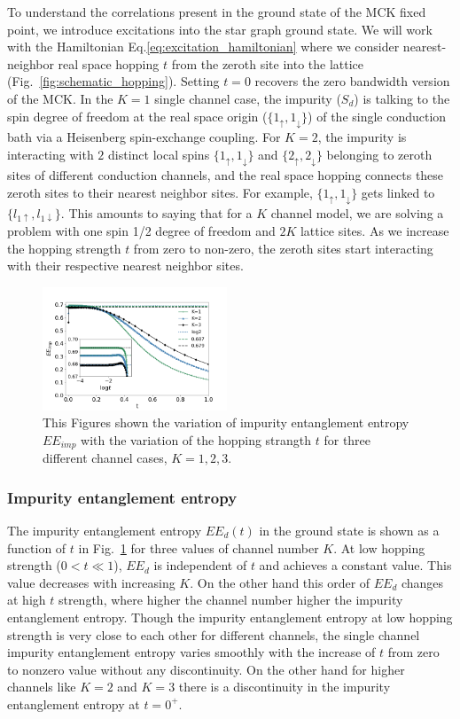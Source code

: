 \documentclass[reprint,prb,superscriptaddress]{revtex4-2}
\begin{document}
To understand the correlations present in the ground state of the MCK fixed point, we introduce excitations into the star graph ground state. We will work with the Hamiltonian Eq.\eqref{eq:excitation_hamiltonian} where we consider nearest-neighbor real space hopping \(t\) from the zeroth site into the lattice (Fig.~\ref{fig:schematic_hopping}). Setting $t=0$ recovers the zero bandwidth version of the MCK. In the \(K=1\) single channel case, the impurity ($S_d$) is talking to the spin degree of freedom at the real space origin ($\{1_{\uparrow},1_{\downarrow}\}$) of the single conduction bath via a Heisenberg spin-exchange coupling. For $K=2$, the impurity is interacting with $2$ distinct local spins $\{1_{\uparrow},1_{\downarrow}\}$ and $\{2_{\uparrow},2_{\downarrow}\}$ belonging to zeroth sites of different conduction channels, and the real space hopping connects these zeroth sites to their nearest neighbor sites. For example, $\{1_{\uparrow},1_{\downarrow}\}$ gets linked to $\{l_{1\uparrow},l_{1\downarrow}\}$. This amounts to saying that for a $K$ channel model, we are solving a problem with one spin 1/2 degree of freedom and $2K$ lattice sites. As we increase the hopping strength $t$ from zero to non-zero, the zeroth sites start interacting with their respective nearest neighbor sites.
\begin{figure}[!htpb]
\centering
\includegraphics[width=0.49\textwidth]{plt/A_I1_ch123_['d']}
\caption{This Figures shown the variation of impurity entanglement entropy $EE_{imp}$ with the variation of the hopping strangth $t$ for three different channel cases, $K=1,2,3$. }
\label{fig:EE_imp_vs_t_K}
\end{figure}

\subsubsection{Impurity entanglement entropy}
The impurity entanglement entropy $EE_d(t)$ in the ground state is shown as a function of $t$ in Fig.~\ref{fig:EE_imp_vs_t_K} for three values of channel number \(K\). At low hopping strength ($0<t\ll 1$), $EE_{d}$ is independent of $t$ and achieves a constant value. This value decreases with increasing \(K\). On the other hand this order of $EE_{d}$ changes at high $t$ strength, where higher the channel number higher the impurity entanglement entropy. Though the impurity entanglement entropy at low hopping strength is very close to each other for different channels, the single channel impurity entanglement entropy varies smoothly with the increase of $t$ from zero to nonzero value without any discontinuity. On the other hand for higher channels like $K=2$ and $K=3$ there is a discontinuity in the impurity entanglement entropy at $t=0^+$.
\end{document}
